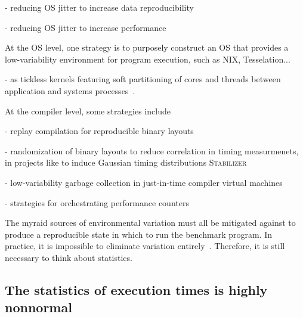 \documentclass[conference]{IEEEtran}
\begin{document}
- reducing OS jitter to increase data reproducibility

- reducing OS jitter to increase performance

At the OS level, one strategy is to purposely construct an OS that provides a
low-variability environment for program execution, such as NIX\cite{},
Tesselation...

- as tickless kernels featuring soft partitioning of cores and threads between application and systems processes~\cite{Akkan2012}.


At the compiler level, some strategies include

- replay compilation for reproducible binary layouts~\cite{Georges2008}

- randomization of binary layouts to reduce correlation in timing measurmenets,
in projects like  to induce Gaussian timing distributions
\textsc{Stabilizer}~\cite{Curtsinger2013}

- low-variability garbage collection in just-in-time compiler virtual machines~\cite{Huang2004}

- strategies for orchestrating performance counters

The myraid sources of environmental variation must all be mitigated against to
produce a reproducible state in which to run the benchmark program. In practice,
it is impossible to eliminate variation entirely~\cite{Alcocer2015,Barrett2016}.
Therefore, it is still necessary to think about statistics.


\subsection{The statistics of execution times is highly nonnormal}
\end{document}
